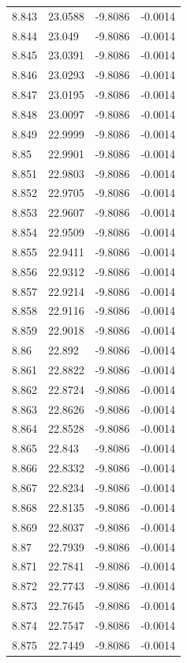 \begin{tabular}{llll}
8.843 & 23.0588 & -9.8086 & -0.0014 \\
8.844 & 23.049 & -9.8086 & -0.0014 \\
8.845 & 23.0391 & -9.8086 & -0.0014 \\
8.846 & 23.0293 & -9.8086 & -0.0014 \\
8.847 & 23.0195 & -9.8086 & -0.0014 \\
8.848 & 23.0097 & -9.8086 & -0.0014 \\
8.849 & 22.9999 & -9.8086 & -0.0014 \\
8.85 & 22.9901 & -9.8086 & -0.0014 \\
8.851 & 22.9803 & -9.8086 & -0.0014 \\
8.852 & 22.9705 & -9.8086 & -0.0014 \\
8.853 & 22.9607 & -9.8086 & -0.0014 \\
8.854 & 22.9509 & -9.8086 & -0.0014 \\
8.855 & 22.9411 & -9.8086 & -0.0014 \\
8.856 & 22.9312 & -9.8086 & -0.0014 \\
8.857 & 22.9214 & -9.8086 & -0.0014 \\
8.858 & 22.9116 & -9.8086 & -0.0014 \\
8.859 & 22.9018 & -9.8086 & -0.0014 \\
8.86 & 22.892 & -9.8086 & -0.0014 \\
8.861 & 22.8822 & -9.8086 & -0.0014 \\
8.862 & 22.8724 & -9.8086 & -0.0014 \\
8.863 & 22.8626 & -9.8086 & -0.0014 \\
8.864 & 22.8528 & -9.8086 & -0.0014 \\
8.865 & 22.843 & -9.8086 & -0.0014 \\
8.866 & 22.8332 & -9.8086 & -0.0014 \\
8.867 & 22.8234 & -9.8086 & -0.0014 \\
8.868 & 22.8135 & -9.8086 & -0.0014 \\
8.869 & 22.8037 & -9.8086 & -0.0014 \\
8.87 & 22.7939 & -9.8086 & -0.0014 \\
8.871 & 22.7841 & -9.8086 & -0.0014 \\
8.872 & 22.7743 & -9.8086 & -0.0014 \\
8.873 & 22.7645 & -9.8086 & -0.0014 \\
8.874 & 22.7547 & -9.8086 & -0.0014 \\
8.875 & 22.7449 & -9.8086 & -0.0014 \\

\end{tabular}
